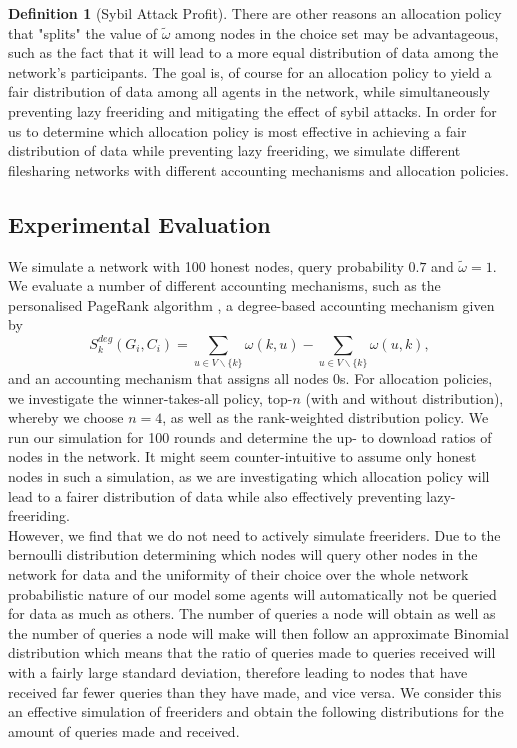 \documentclass[11pt,a4paper]{report}
\theoremstyle{definition}
\newtheorem{definition}{Definition}[section]
\theoremstyle{theorem}
\theoremstyle{proposition}
\theoremstyle{corollary}
\theoremstyle{lemma}
\theoremstyle{example}
\theoremstyle{remark}
\begin{document}
\begin{definition}[Sybil Attack Profit]
\noindent{}There are other reasons an allocation policy that "splits" the value of $\tilde{\omega}$ among nodes in the choice set may be advantageous, such as the fact that it will lead to a more equal distribution of data among the network's participants. The goal is, of course for an allocation policy to yield a fair distribution of data among all agents in the network, while simultaneously preventing lazy freeriding and mitigating the effect of sybil attacks. In order for us to determine which allocation policy is most effective in achieving a fair distribution of data while preventing lazy freeriding, we simulate different filesharing networks with different accounting mechanisms and allocation policies.\vspace{1em}\\

\subsection{Experimental Evaluation}
\label{subsec:Experimental Evaluation}
\noindent{}We simulate a network with 100 honest nodes, query probability $0.7$ and $\tilde{\omega}=1$. We evaluate a number of different accounting mechanisms, such as the personalised PageRank algorithm \cite{A Random Walk Based Trust Ranking in Distributed Systems}, a degree-based accounting mechanism given by 
\[
S^{deg}_k(G_i,C_i)=\sum\limits_{u\in{}V\backslash\{k\}}\omega(k,u) - \sum\limits_{u\in{}V\backslash\{k\}}\omega(u,k),
\]
\noindent{}and an accounting mechanism that assigns all nodes $0$s. For allocation policies, we investigate the winner-takes-all policy, top-$n$ (with and without distribution), whereby we choose $n=4$, as well as the rank-weighted distribution policy. We run our simulation for 100 rounds and determine the up- to download ratios of nodes in the network. It might seem counter-intuitive to assume only honest nodes in such a simulation, as we are investigating which allocation policy will lead to a fairer distribution of data while also effectively preventing lazy-freeriding. \vspace{1em}\\

\noindent{}However, we find that we do not need to actively simulate freeriders. Due to the bernoulli distribution determining which nodes will query other nodes in the network for data and the uniformity of their choice over the whole network probabilistic nature of our model some agents will automatically not be queried for data as much as others. The number of queries a node will obtain as well as the number of queries a node will make will then follow an approximate Binomial distribution which means that the ratio of queries made to queries received will with a fairly large standard deviation, therefore leading to nodes that have received far fewer queries than they have made, and vice versa. We consider this an effective simulation of freeriders and obtain the following distributions for the amount of queries made and received. \vspace{1em}\\


\end{definition}
\end{document}
